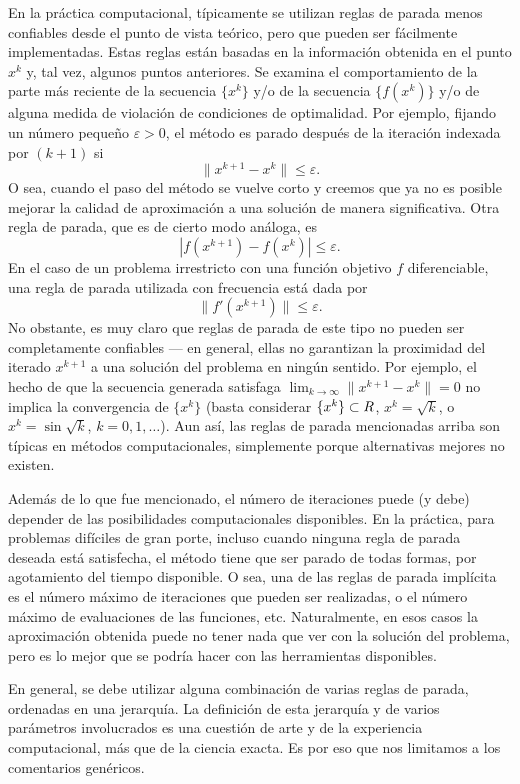 En la práctica computacional, típicamente se utilizan reglas de parada menos confiables desde el punto de vista teórico, pero que pueden ser fácilmente implementadas. Estas reglas están basadas en la información obtenida en el punto $x^k$ y, tal vez, algunos puntos anteriores. Se examina el comportamiento de la parte más reciente de la secuencia $\{x^k\}$ y/o de la secuencia $\{f(x^k)\}$ y/o de alguna medida de violación de condiciones de optimalidad. Por ejemplo, fijando un número pequeño $\varepsilon > 0$, el método es parado después de la iteración indexada por $(k + 1)$ si
\[
    \|x^{k+1} - x^k\| \le \varepsilon.
\]
O sea, cuando el paso del método se vuelve corto y creemos que ya no es posible mejorar la calidad de aproximación a una solución de manera significativa. Otra regla de parada, que es de cierto modo análoga, es
\[
    |f(x^{k+1}) - f(x^k)| \le \varepsilon.
\]
En el caso de un problema irrestricto con una función objetivo $f$ diferenciable, una regla de parada utilizada con frecuencia está dada por
\[
    \|f'(x^{k+1})\| \le \varepsilon.
\]
No obstante, es muy claro que reglas de parada de este tipo no pueden ser completamente confiables — en general, ellas no garantizan la proximidad del iterado $x^{k+1}$ a una solución del problema en ningún sentido. Por ejemplo, el hecho de que la secuencia generada satisfaga $\lim_{k \to \infty} \|x^{k+1} - x^k\| = 0$ no implica la convergencia de $\{x^k\}$ (basta considerar $\{x^k\} \subset R$, $x^k = \sqrt{k}$, o $x^k = \sin \sqrt{k}$, $k = 0, 1, \dots$). Aun así, las reglas de parada mencionadas arriba son típicas en métodos computacionales, simplemente porque alternativas mejores no existen.

Además de lo que fue mencionado, el número de iteraciones puede (y debe) depender de las posibilidades computacionales disponibles. En la práctica, para problemas difíciles de gran porte, incluso cuando ninguna regla de parada deseada está satisfecha, el método tiene que ser parado de todas formas, por agotamiento del tiempo disponible. O sea, una de las reglas de parada implícita es el número máximo de iteraciones que pueden ser realizadas, o el número máximo de evaluaciones de las funciones, etc. Naturalmente, en esos casos la aproximación obtenida puede no tener nada que ver con la solución del problema, pero es lo mejor que se podría hacer con las herramientas disponibles.

En general, se debe utilizar alguna combinación de varias reglas de parada, ordenadas en una jerarquía. La definición de esta jerarquía y de varios parámetros involucrados es una cuestión de arte y de la experiencia computacional, más que de la ciencia exacta. Es por eso que nos limitamos a los comentarios genéricos.

